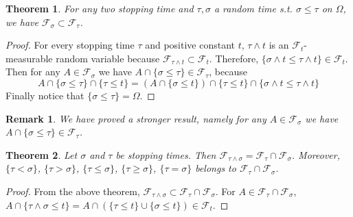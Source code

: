 \documentclass{article}
\newtheorem{Thm}{Theorem}[section]
\newtheorem*{Rk}{Remark}
\theoremstyle{definition}
\begin{document}
\begin{Thm}
    For any two stopping time and $\tau,\sigma$ a random time s.t. $\sigma\le \tau$ on $\Omega$, we have $\mathcal{F}_\sigma\subset\mathcal{F}_\tau$.
\end{Thm}
\begin{proof}
    For every stopping time $\tau$ and positive constant $t$, $\tau\wedge t$ is an $\mathcal{F}_t$-measurable random variable
    because $\mathcal{F}_{\tau\wedge t}\subset\mathcal{F}_t$. Therefore, $\{\sigma\wedge t\le \tau\wedge t\}\in \mathcal{F}_t$.
    Then for any $A\in\mathcal{F}_\sigma$ we have $A\cap\{\sigma\le \tau\}\in\mathcal{F}_\tau$, because
    \[ A\cap\{\sigma\le \tau\}\cap \{\tau\le t\}= (A\cap \{\sigma\le t\})\cap \{\tau\le t\}\cap \{\sigma\wedge t\le \tau\wedge t\}\]
    Finally notice that $\{\sigma\le \tau\}=\Omega$.
\end{proof}
\begin{Rk}
    We have proved a stronger result, namely
    for any $A\in\mathcal{F}_\sigma$ we have $A\cap\{\sigma\le \tau\}\in\mathcal{F}_\tau$.
\end{Rk}
\begin{Thm}
    Let $\sigma$ and $\tau$ be stopping times. Then $\mathcal{F}_{\tau\wedge \sigma}=\mathcal{F}_\tau\cap\mathcal{F}_\sigma$.\newline 
    Moreover, $\{\tau<\sigma\}$, $\{\tau>\sigma\}$, $\{\tau\le \sigma\}$, $\{\tau\ge \sigma\}$, $\{\tau=\sigma\}$ belongs to $\mathcal{F}_\tau\cap\mathcal{F}_\sigma$.
\end{Thm}
\begin{proof}
    From the above theorem, $\mathcal{F}_{\tau\wedge \sigma}\subset \mathcal{F}_{\tau}\cap\mathcal{F}_\sigma$.\newline 
    For $A\in \mathcal{F}_{\tau}\cap\mathcal{F}_\sigma$, $A\cap \{\tau\wedge \sigma\le t\}=A\cap(\{\tau\le t\}\cup\{\sigma\le t\})\in\mathcal{F}_t$.
\end{proof}
\end{document}
